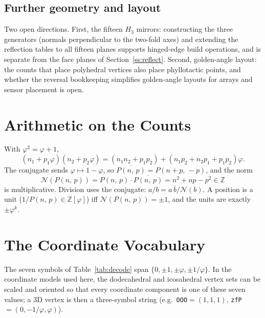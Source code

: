 \documentclass[11pt]{article}
\theoremstyle{definition}
\theoremstyle{remark}
\newcommand{\Z}{\mathbb{Z}}
\newcommand{\Zphi}{\mathbb{Z}[\varphi]}
\newcommand{\Pb}[2]{P(#1,\,#2)}
\newcommand{\Norm}{\mathcal{N}}
\begin{document}
\subsection{Further geometry and layout}
\label{ss:more}

Two open directions. First, the fifteen $H_3$ mirrors: constructing the three
generators (normals perpendicular to the two-fold axes) and extending the
reflection tables to all fifteen planes supports hinged-edge build operations, and
is separate from the face planes of Section~\ref{ss:reflect}. Second, golden-angle
layout: the counts that place polyhedral vertices also place phyllotactic points,
and whether the reversal bookkeeping simplifies golden-angle layouts for arrays
and sensor placement is open.

\appendix

\section{Arithmetic on the Counts}
\label{app:ring}
With $\varphi^2=\varphi+1$,
\[
  (n_1+p_1\varphi)(n_2+p_2\varphi)
   =(n_1n_2+p_1p_2)+(n_1p_2+n_2p_1+p_1p_2)\varphi.
\]
The conjugate sends $\varphi\mapsto1-\varphi$, so
$\overline{\Pb{n}{p}}=\Pb{n+p}{-p}$, and the norm
\[
  \Norm(\Pb{n}{p})=\Pb{n}{p}\cdot\overline{\Pb{n}{p}}=n^2+np-p^2\in\Z
\]
is multiplicative. Division uses the conjugate: $a/b=a\,\overline{b}/\Norm(b)$.
A position is a unit ($1/{\Pb{n}{p}}\in\Zphi$) iff $\Norm(\Pb{n}{p})=\pm1$, and
the units are exactly $\pm\varphi^k$.

\section{The Coordinate Vocabulary}
\label{app:decode}
The seven symbols of Table~\ref{tab:decode} span
$\{0,\pm1,\pm\varphi,\pm1/\varphi\}$. In the coordinate models used here, the
dodecahedral and icosahedral vertex sets can be scaled and oriented so that every
coordinate component is one of these seven values; a 3D vertex is then a
three-symbol string (e.g.\ \texttt{OOO}$=(1,1,1)$,
\texttt{zfP}$=(0,-1/\varphi,\varphi)$).
\end{document}
